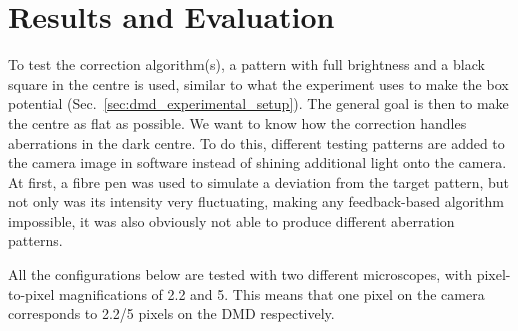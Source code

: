 

\chapter{Results and Evaluation}
\label{cha:dmd_results}
To test the correction algorithm(s), a pattern with full brightness and a black square in the centre is used, similar to what the experiment uses to make the box potential (Sec.~\ref{sec:dmd_experimental_setup}). The general goal is then to make the centre as flat as possible. We want to know how the correction handles aberrations in the dark centre. To do this, different testing patterns are added to the camera image in software instead of shining additional light onto the camera. At first, a fibre pen was used to simulate a deviation from the target pattern, but not only was its intensity very fluctuating, making any feedback-based algorithm impossible, it was also obviously not able to produce different aberration patterns.

All the configurations below are tested with two different microscopes, with pixel-to-pixel magnifications of \num{2.2} and \num{5}. This means that one pixel on the camera corresponds to \num{2.2}/\num{5} pixels on the DMD respectively.


